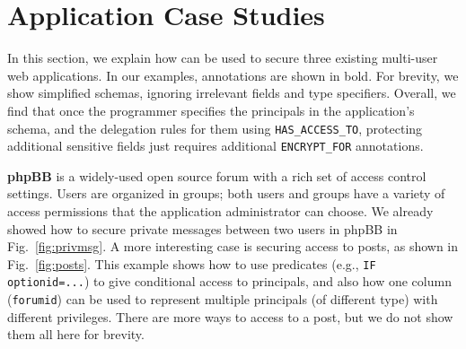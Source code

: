 
\section{Application Case Studies}
\label{s:apps}

In this section, we explain how \name can be used to secure three
existing multi-user web applications.  In our examples, annotations
are shown in bold.  For brevity, we show simplified schemas, ignoring
irrelevant fields and type specifiers.  Overall, we find that once the
programmer specifies the principals in the application's schema, and
the delegation rules for them using {\small \tt HAS\_ACCESS\_TO},
protecting additional sensitive fields just requires additional
{\small \tt ENCRYPT\_FOR} annotations.

{\bf phpBB} is a widely-used open source forum with a rich set of
access control settings. Users are organized in groups; both users and
groups have a variety of access permissions that the application
administrator can choose. We already showed how to secure private
messages between two users in phpBB in Fig.~\ref{fig:privmsg}.  A more
interesting case is securing access to posts, as shown in
Fig.~\ref{fig:posts}.  This example shows how to use predicates
(e.g., {\small \tt IF optionid=...}) to give conditional access to
principals, and also how one column ({\tt forumid}) can be used to
represent multiple principals (of different type) with different
privileges.  There are more ways to access to a post, but we do not
show them all here for brevity.


